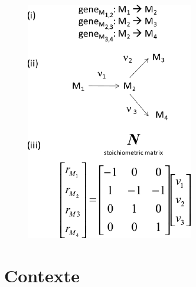 \documentclass[11pt]{beamer}
\begin{document}
\begin{frame}
\begin{minipage}{6cm}
\begin{figure}[h]
\begin{center}
\begin{minipage}[c]{0.9\textwidth}
			 \end{minipage}
  		\end{center}	
	\end{figure}
	\end{minipage}
	\begin{minipage}{4cm}
		\begin{figure}[h]
			\begin{center}
   				\begin{minipage}[c]{0.9\textwidth}
  					\includegraphics[scale=2.5]{modelem.png}
				 \end{minipage}
  			\end{center}	
		 \end{figure}
	\end{minipage}
\end{frame}

\section{Contexte}			
\end{document}
